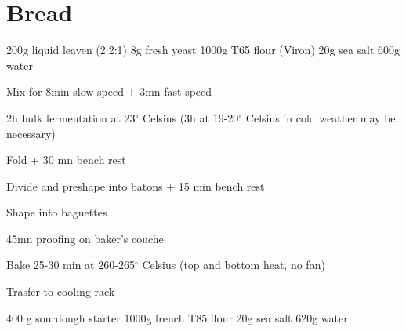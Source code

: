 \chapter{Bread}
\minitoc

\label{rec:bread-baguette}

\begin{ingreds}
	200g liquid leaven (2:2:1)
	8g fresh yeast
	1000g T65 flour (Viron)
	20g sea salt
	600g water

\end{ingreds}

\begin{method}
Mix for 8min slow speed + 3mn fast speed

2h bulk fermentation at 23$^{\circ}$ Celsius (3h at 19-20$^{\circ}$ Celsius in cold weather may be necessary)

Fold + 30 mn bench rest

Divide and preshape into batons + 15 min bench rest

Shape into baguettes

45mn proofing on baker's couche

Bake 25-30 min at 260-265$^{\circ}$ Celsius (top and bottom heat, no fan)

Trasfer to cooling rack

\end {method}

\label{rec:bread-campagne}

\begin{ingreds}
	400 g sourdough starter
	1000g french T85 flour
	20g sea salt
	620g water
\end{ingreds}

